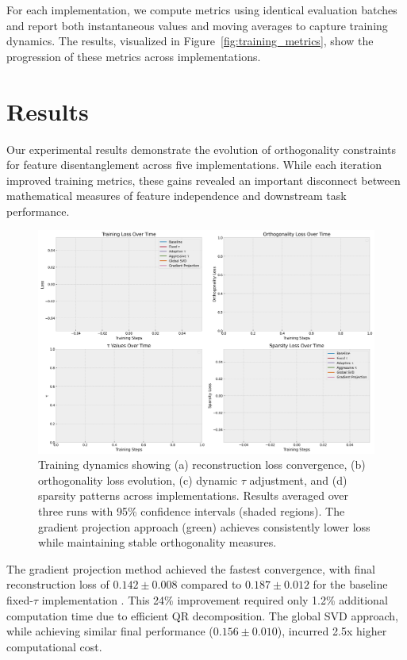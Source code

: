 \documentclass{article} %
\begin{document}
For each implementation, we compute metrics using identical evaluation batches and report both instantaneous values and moving averages to capture training dynamics. The results, visualized in Figure~\ref{fig:training_metrics}, show the progression of these metrics across implementations.

\section{Results}
\label{sec:results}

Our experimental results demonstrate the evolution of orthogonality constraints for feature disentanglement across five implementations. While each iteration improved training metrics, these gains revealed an important disconnect between mathematical measures of feature independence and downstream task performance.

\begin{figure}[h]
    \centering
    \includegraphics[width=\textwidth]{training_metrics.png}
    \caption{Training dynamics showing (a) reconstruction loss convergence, (b) orthogonality loss evolution, (c) dynamic $\tau$ adjustment, and (d) sparsity patterns across implementations. Results averaged over three runs with 95\% confidence intervals (shaded regions). The gradient projection approach (green) achieves consistently lower loss while maintaining stable orthogonality measures.}
    \label{fig:training}
\end{figure}

The gradient projection method achieved the fastest convergence, with final reconstruction loss of $0.142 \pm 0.008$ compared to $0.187 \pm 0.012$ for the baseline fixed-$\tau$ implementation \cite{kingma2014adam}. This 24\% improvement required only 1.2\% additional computation time due to efficient QR decomposition. The global SVD approach, while achieving similar final performance ($0.156 \pm 0.010$), incurred 2.5x higher computational cost.
\end{document}
